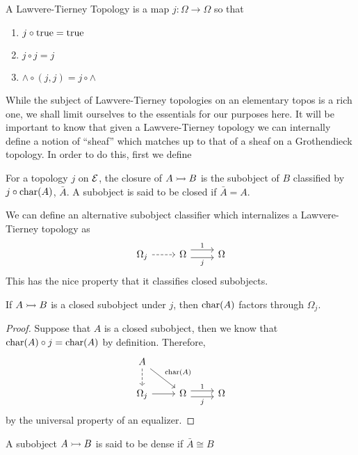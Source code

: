 \begin{defn}\label{defn:background:lawveretierney}
  A Lawvere-Tierney Topology is a map $j : \Omega \to \Omega$ so that
  \begin{enumerate}
  \item $j \circ \operatorname{true} = \operatorname{true}$
  \item $j \circ j = j$
  \item $\wedge \circ (j, j) = j \circ \wedge$
  \end{enumerate}
\end{defn}
While the subject of Lawvere-Tierney topologies on an elementary topos
is a rich one, we shall limit ourselves to the essentials for our
purposes here. It will be important to know that given a
Lawvere-Tierney topology we can internally define a notion of
``sheaf'' which matches up to that of a sheaf on a Grothendieck
topology. In order to do this, first we define
\begin{defn}\label{defn:background:closure}
  For a topology $j$ on $\mathcal{E}$, the closure of $A \rightarrowtail B$ is the
  subobject of $B$ classified by $j \circ \operatorname{char}(A)$, $\bar{A}$. A
  subobject is said to be closed if $\bar{A} = A$.
\end{defn}

We can define an alternative subobject classifier which internalizes
a Lawvere-Tierney topology as
\[
  \begin{tikzcd}
    \Omega_j \ar[r, dashed] &
    \Omega \ar[r, shift left=0.5em, "1"]
    \ar[r, shift right=0.3em, swap, "j"] &
    \Omega
  \end{tikzcd}
\]
This has the nice property that it classifies closed subobjects.
\begin{lem}\label{lem:background:closedfactors}
  If $A \rightarrowtail B$ is a closed subobject under $j$, then $\operatorname{char}(A)$
  factors through $\Omega_j$.
\end{lem}
\begin{proof}
  Suppose that $A$ is a closed subobject, then we know that
  $\operatorname{char}(A) \circ j = \operatorname{char}(A)$ by definition. Therefore,
  \[
    \begin{tikzcd}
      A \ar[d, dashed] \ar[dr, "\charmap(A)"] & &\\
      \Omega_j \ar[r]&
      \Omega \ar[r, shift left=0.3em, "1"] \ar[r, shift right = 0.3em, swap, "j"] & \Omega
    \end{tikzcd}
  \]
  by the universal property of an equalizer.
\end{proof}

\begin{defn}\label{defn:background:dense}
  A subobject $A \rightarrowtail B$ is said to be dense if $\bar{A} \cong B$
\end{defn}

